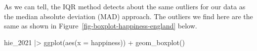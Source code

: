 \documentclass[
  letterpaper,
]{krantz}
\makeatletter
\newenvironment{Shaded}{\begin{snugshade}}{\end{snugshade}}
\newcommand{\AttributeTok}[1]{\textcolor[rgb]{0.40,0.45,0.13}{#1}}
\newcommand{\FunctionTok}[1]{\textcolor[rgb]{0.28,0.35,0.67}{#1}}
\newcommand{\NormalTok}[1]{\textcolor[rgb]{0.00,0.23,0.31}{#1}}
\newcommand{\SpecialCharTok}[1]{\textcolor[rgb]{0.37,0.37,0.37}{#1}}
\newenvironment{kframe}{%
\medskip{}
\setlength{\fboxsep}{.8em}
 \def\at@end@of@kframe{}%
 \ifinner\ifhmode%
  \def\at@end@of@kframe{\end{minipage}}%
  \begin{minipage}{\columnwidth}%
 \fi\fi%
 \def\FrameCommand##1{\hskip\@totalleftmargin \hskip-\fboxsep
 \colorbox{shadecolor}{##1}\hskip-\fboxsep
     \hskip-\linewidth \hskip-\@totalleftmargin \hskip\columnwidth}%
 \MakeFramed {\advance\hsize-\width
   \@totalleftmargin\z@ \linewidth\hsize
   \@setminipage}}%
 {\par\unskip\endMakeFramed%
 \at@end@of@kframe}
\renewenvironment{Shaded}{\begin{kframe}}{\end{kframe}}
\makeatother
\begin{document}
\begin{figure}[H]


\caption{\label{fig-iqr-threshold}}

\end{figure}%

As we can tell, the IQR method detects about the same outliers for our
data as the median absolute deviation (MAD) approach. The outliers we
find here are the same as shown in
Figure~\ref{fig-boxplot-happiness-england} below.

\begin{Shaded}
\begin{Highlighting}[]
\NormalTok{hie\_2021 }\SpecialCharTok{|\textgreater{}}
  \FunctionTok{ggplot}\NormalTok{(}\FunctionTok{aes}\NormalTok{(}\AttributeTok{x =}\NormalTok{ happiness)) }\SpecialCharTok{+}
  \FunctionTok{geom\_boxplot}\NormalTok{()}
\end{Highlighting}
\end{Shaded}
\end{document}
